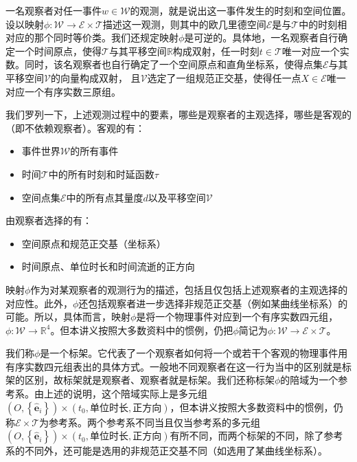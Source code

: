 \documentclass[main.tex]{subfiles}
\begin{document}
一名观察者对任一事件$w\in\mathcal{W}$的观测，就是说出这一事件发生的时刻和空间位置。设以映射$\phi:\mathcal{W}\rightarrow\mathcal{E}\times\mathcal{T}$描述这一观测，则其中的欧几里德空间$\mathcal{E}$是与$\mathcal{T}$中的时刻相对应的那个同时等价类。我们还规定映射$\phi$是可逆的。具体地，一名观察者自行确定一个时间原点，使得$\mathcal{T}$与其平移空间$\mathbb{R}$构成双射，任一时刻$t\in\mathcal{T}$唯一对应一个实数。同时，该名观察者也自行确定了一个空间原点和直角坐标系，使得点集$\mathcal{E}$与其平移空间$\mathcal{V}$的向量构成双射， 且$\mathcal{V}$选定了一组规范正交基，使得任一点$X\in\mathcal{E}$唯一对应一个有序实数三原组。

我们罗列一下，上述观测过程中的要素，哪些是观察者的主观选择，哪些是客观的（即不依赖观察者）。客观的有：
\begin{itemize}
    \item 事件世界$\mathcal{W}$的所有事件
    \item 时间$\mathcal{T}$中的所有时刻和时延函数$\tau$
    \item 空间点集$\mathcal{E}$中的所有点其量度$d$以及平移空间$\mathcal{V}$
\end{itemize}
由观察者选择的有：
\begin{itemize}
    \item 空间原点和规范正交基（坐标系）
    \item 时间原点、单位时长和时间流逝的正方向
\end{itemize}
映射$\phi$作为对某观察者的观测行为的描述，包括且仅包括上述观察者的主观选择的对应性。此外，$\phi$还包括观察者进一步选择非规范正交基（例如某曲线坐标系）的可能。所以，具体而言，映射$\phi$是将一个物理事件对应到一个有序实数四元组，$\phi:\mathcal{W}\rightarrow\mathbb{R}^4$。但本讲义按照大多数资料中的惯例，仍把$\phi$简记为$\phi:\mathcal{W}\rightarrow\mathcal{E}\times\mathcal{T}$。

我们称$\phi$是一个标架。它代表了一个观察者如何将一个或若干个客观的物理事件用有序实数四元组表出的具体方式。一般地不同观察者在这一行为当中的区别就是标架的区别，故标架就是观察者、观察者就是标架。我们还称标架$\phi$的陪域为一个参考系。由上述的说明，这个陪域实际上是多元组$\left(O,\left\{\mathbf{\hat{e}}_i\right\}\right)\times\left(t_0,\text{单位时长},\text{正方向}\right)$，但本讲义按照大多数资料中的惯例，仍称$\mathcal{E}\times\mathcal{T}$为参考系。两个参考系不同当且仅当参考系的多元组$\left(O,\left\{\mathbf{\hat{e}}_i\right\}\right)\times\left(t_0,\text{单位时长},\text{正方向}\right)$有所不同，而两个标架的不同，除了参考系的不同外，还可能是选用的非规范正交基不同（如选用了某曲线坐标系）。
\end{document}
